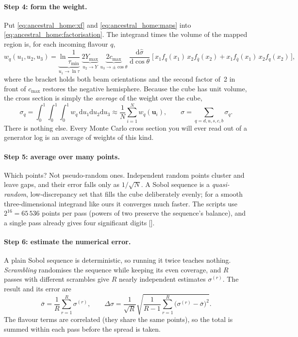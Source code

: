 \paragraph{Step 4: form the weight.} Put \cref{eq:ancestral_home:xf} and
\cref{eq:ancestral_home:maps} into \cref{eq:ancestral_home:factorisation}.
The integrand times the volume of the mapped region is, for each incoming
flavour $q$,
\begin{equation}
  w_q(u_1,u_2,u_3)=
  \underbrace{\ln\frac{1}{\tau_{\min}}}_{u_1\to\ln\tau}\;
  \underbrace{2Y_{\max}}_{u_2\to Y}\;
  \underbrace{2c_{\max}}_{u_3\to\pm\cos\theta}\;
  \frac{\mathrm{d}\hat\sigma}{\mathrm{d}\cos\theta}\;
  \bigl[\,x_1f_q(x_1)\,x_2f_{\bar q}(x_2)+x_1f_{\bar q}(x_1)\,x_2f_q(x_2)\,\bigr],
  \label{eq:ancestral_home:weight}
\end{equation}
where the bracket holds both beam orientations and the second factor of~2 in
front of $c_{\max}$ restores the negative hemisphere. Because the cube has
unit volume, the cross section is simply the \emph{average} of the weight
over the cube,
\begin{equation}
  \sigma_q=\int_0^1\!\!\int_0^1\!\!\int_0^1 w_q\,\mathrm{d}u_1\mathrm{d}u_2\mathrm{d}u_3
  \approx\frac1N\sum_{i=1}^{N}w_q(\mathbf u_i),\qquad
  \sigma=\sum_{q=d,u,s,c,b}\sigma_q .
  \label{eq:ancestral_home:average}
\end{equation}
There is nothing else. Every Monte Carlo cross section you will ever read
out of a generator log is an average of weights of this kind.

\paragraph{Step 5: average over many points.} Which points? Not
pseudo-random ones. Independent random points cluster and leave gaps, and
their error falls only as $1/\sqrt N$. A Sobol sequence is a
\emph{quasi-random}, low-discrepancy set that fills the cube deliberately
evenly; for a smooth three-dimensional integrand like ours it converges much
faster. The scripts use $2^{16}=65\,536$ points per pass (powers of two
preserve the sequence's balance), and a single pass already gives four
significant digits [].

\paragraph{Step 6: estimate the numerical error.} A plain Sobol sequence is
deterministic, so running it twice teaches nothing. \emph{Scrambling}
randomises the sequence while keeping its even coverage, and $R$ passes with
different scrambles give $R$ nearly independent estimates
$\sigma^{(r)}$. The result and its error are
\begin{equation}
  \bar\sigma=\frac1R\sum_{r=1}^{R}\sigma^{(r)},\qquad
  \Delta\sigma=\frac{1}{\sqrt R}\sqrt{\frac{1}{R-1}\sum_{r=1}^{R}\bigl(\sigma^{(r)}-\bar\sigma\bigr)^2}.
  \label{eq:ancestral_home:error}
\end{equation}
The flavour terms are correlated (they share the same points), so the total
is summed within each pass before the spread is taken.

